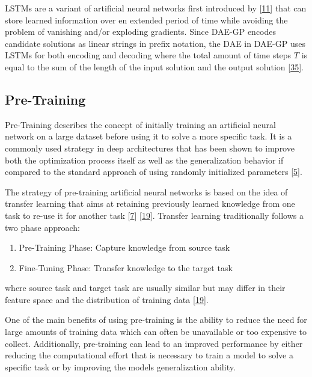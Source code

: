 \documentclass[
  11pt,
]{article}
\providecommand{\tightlist}{%
  \setlength{\itemsep}{0pt}\setlength{\parskip}{0pt}}
\begin{document}
LSTMs are a variant of artificial neural networks first introduced by {[}\protect\hyperlink{ref-lstm_orig}{11}{]} that can store learned information over en extended period of time while avoiding the problem of vanishing and/or exploding gradients.
Since DAE-GP encodes candidate solutions as linear strings in prefix notation, the DAE in DAE-GP uses LSTMs for both encoding and decoding where the total amount of time steps \(T\) is equal to the sum of the length of the input solution and the output solution {[}\protect\hyperlink{ref-dae-gp_2020_rtree}{35}{]}.

\hypertarget{pre-training}{%
\subsection{Pre-Training}\label{pre-training}}

Pre-Training describes the concept of initially training an artificial neural network on a large dataset before using it to solve a more specific task.
It is a commonly used strategy in deep architectures that has been shown to improve both the optimization process itself as well as the generalization behavior if compared to the standard approach of using randomly initialized parameters {[}\protect\hyperlink{ref-pmlr-v5-erhan09a}{5}{]}.

The strategy of pre-training artificial neural networks is based on the idea of transfer learning that aims at retaining previously learned knowledge from one task to re-use it for another task {[}\protect\hyperlink{ref-HAN2021225}{7}{]} {[}\protect\hyperlink{ref-survey_transfer_learning}{19}{]}.
Transfer learning traditionally follows a two phase approach:

\begin{enumerate}
\def\labelenumi{\arabic{enumi}.}
\tightlist
\item
  Pre-Training Phase: Capture knowledge from source task
\item
  Fine-Tuning Phase: Transfer knowledge to the target task
\end{enumerate}

where source task and target task are usually similar but may differ in their feature space and the distribution of training data {[}\protect\hyperlink{ref-survey_transfer_learning}{19}{]}.

One of the main benefits of using pre-training is the ability to reduce the need for large amounts of training data which can often be unavailable or too expensive to collect.
Additionally, pre-training can lead to an improved performance by either reducing the computational effort that is necessary to train a model to solve a specific task or by improving the models generalization ability.
\end{document}
